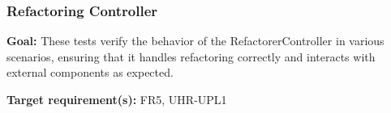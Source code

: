 \documentclass[12pt, titlepage]{article}
\begin{document}
					
					
					

					
					
					
					





  
\newpage

\subsubsection{Refactoring Controller}

\textbf{Goal:} These tests verify the behavior of the RefactorerController in various scenarios, ensuring that it handles refactoring correctly and interacts with external components as expected.

\textbf{Target requirement(s):} FR5, UHR-UPL1 ~\cite{SRS} \\
\end{document}
